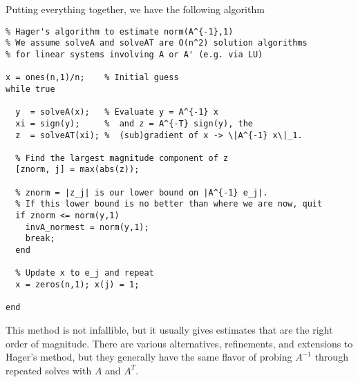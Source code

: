 Putting everything together, we have the following algorithm
\begin{lstlisting}
% Hager's algorithm to estimate norm(A^{-1},1)
% We assume solveA and solveAT are O(n^2) solution algorithms
% for linear systems involving A or A' (e.g. via LU)

x = ones(n,1)/n;    % Initial guess
while true

  y  = solveA(x);   % Evaluate y = A^{-1} x
  xi = sign(y);     %  and z = A^{-T} sign(y), the
  z  = solveAT(xi); %  (sub)gradient of x -> \|A^{-1} x\|_1.

  % Find the largest magnitude component of z
  [znorm, j] = max(abs(z));

  % znorm = |z_j| is our lower bound on |A^{-1} e_j|.
  % If this lower bound is no better than where we are now, quit
  if znorm <= norm(y,1)
    invA_normest = norm(y,1);
    break;
  end

  % Update x to e_j and repeat
  x = zeros(n,1); x(j) = 1;

end
\end{lstlisting}

This method is not infallible, but it usually gives estimates that are
the right order of magnitude.  There are various alternatives,
refinements, and extensions to Hager's method, but they generally have
the same flavor of probing $A^{-1}$ through repeated solves with $A$
and $A^T$.
